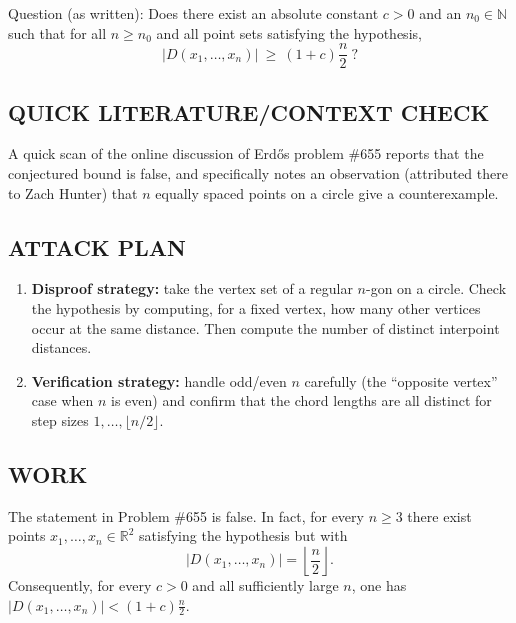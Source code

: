 Question (as written): Does there exist an absolute constant $c>0$ and an $n_0\in\mathbb{N}$ such that for all $n\ge n_0$ and all point sets satisfying the hypothesis,
\[
|D(x_1,\dots,x_n)|\ \ge\ (1+c)\frac{n}{2}\ ?
\]

\subsection*{QUICK LITERATURE/CONTEXT CHECK}
A quick scan of the online discussion of Erd\H{o}s problem \#655 reports that the conjectured bound is false, and specifically notes an observation (attributed there to Zach Hunter) that $n$ equally spaced points on a circle give a counterexample.

\subsection*{ATTACK PLAN}
\begin{enumerate}[leftmargin=*]
\item \textbf{Disproof strategy:} take the vertex set of a regular $n$-gon on a circle. Check the hypothesis by computing, for a fixed vertex, how many other vertices occur at the same distance. Then compute the number of distinct interpoint distances.
\item \textbf{Verification strategy:} handle odd/even $n$ carefully (the ``opposite vertex'' case when $n$ is even) and confirm that the chord lengths are all distinct for step sizes $1,\dots,\lfloor n/2\rfloor$.
\end{enumerate}

\subsection*{WORK}
\begin{theorem}[Counterexample]
The statement in Problem \#655 is false. In fact, for every $n\ge 3$ there exist points $x_1,\dots,x_n\in\mathbb{R}^2$ satisfying the hypothesis but with
\[
|D(x_1,\dots,x_n)|=\left\lfloor\frac{n}{2}\right\rfloor.
\]
Consequently, for every $c>0$ and all sufficiently large $n$, one has
$|D(x_1,\dots,x_n)|<(1+c)\frac{n}{2}$.
\end{theorem}

